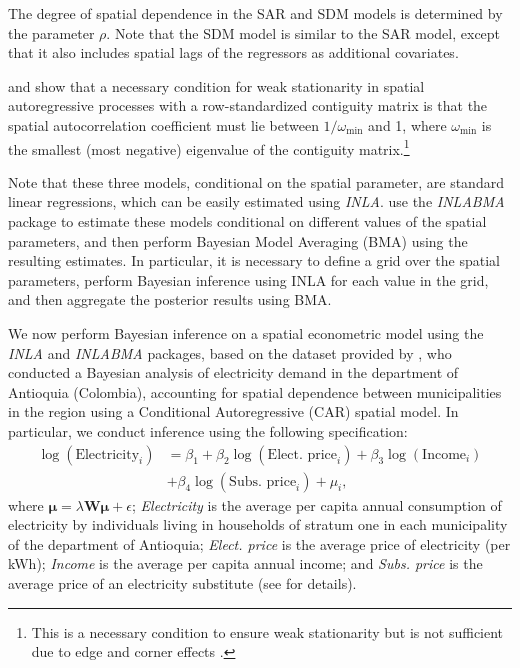 The degree of spatial dependence in the SAR and SDM models is determined by the parameter \( \rho \). Note that the SDM model is similar to the SAR model, except that it also includes spatial lags of the regressors as additional covariates.

\cite{ord75} and \cite{anselin82} show that a necessary condition for weak stationarity in spatial autoregressive processes with a row-standardized contiguity matrix is that the spatial autocorrelation coefficient must lie between \( 1/\omega_{\min} \) and 1, where \( \omega_{\min} \) is the smallest (most negative) eigenvalue of the contiguity matrix.\footnote{This is a necessary condition to ensure weak stationarity but is not sufficient due to edge and corner effects \cite{haining90}.}

Note that these three models, conditional on the spatial parameter, are standard linear regressions, which can be easily estimated using \textit{INLA}. \cite{bivand2015spatial} use the \textit{INLABMA} package to estimate these models conditional on different values of the spatial parameters, and then perform Bayesian Model Averaging (BMA) using the resulting estimates. In particular, it is necessary to define a grid over the spatial parameters, perform Bayesian inference using INLA for each value in the grid, and then aggregate the posterior results using BMA.

We now perform Bayesian inference on a spatial econometric model using the \textit{INLA} and \textit{INLABMA} packages, based on the dataset provided by \cite{ramirez2019welfare}, who conducted a Bayesian analysis of electricity demand in the department of Antioquia (Colombia), accounting for spatial dependence between municipalities in the region using a Conditional Autoregressive (CAR) spatial model. In particular, we conduct inference using the following specification:
\begin{align*}
	\log(\text{Electricity}_i)&=\beta_1+\beta_2\log(\text{Elect. price}_i)+\beta_3\log(\text{Income}_i)\\
	&+\beta_4\log(\text{Subs. price}_i)+\mu_i,
\end{align*} 
where \( \boldsymbol{\mu} = \lambda \boldsymbol{W} \boldsymbol{\mu} + \epsilon \); \textit{Electricity} is the average per capita annual consumption of electricity by individuals living in households of stratum one in each municipality of the department of Antioquia; \textit{Elect. price} is the average price of electricity (per kWh); \textit{Income} is the average per capita annual income; and \textit{Subs. price} is the average price of an electricity substitute (see \cite{ramirez2019welfare} for details).


